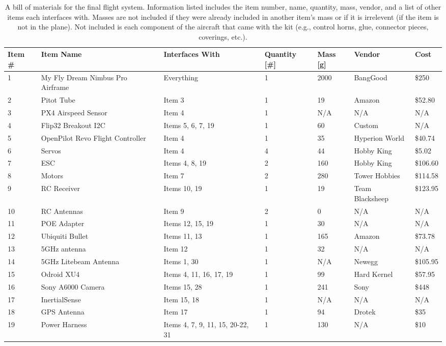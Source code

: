 \documentclass[]{auvsi_doc}
\begin{document}
	\begin{table}[h!]
		\begin{center}
			\caption{A bill of materials for the final flight system. Information listed includes the item number, name, quantity, mass, vendor, and a list of other items each interfaces with. Masses are not included if they were already included in another item's mass or if it is irrelevent (if the item is not in the plane). Not included is each component of the aircraft that came with the kit (e.g., control horns, glue, connector pieces, coverings, etc.).}
			\label{table:BOM}
			\begin{tabular}{p{1cm}p{4cm}p{3cm}p{1.5cm}p{1cm}p{2.5cm}p{1cm}}
				\toprule
				Item \# & Item Name & Interfaces With & Quantity [\#] & Mass [g] & Vendor & Cost \\
				\midrule
				1 & My Fly Dream Nimbus Pro Airframe & Everything & 1 & 2000 & BangGood & \$250  \\
				2 & Pitot Tube & Item 3 & 1 & 19 & Amazon & \$52.80\\
				3 & PX4 Airspeed Sensor & Item 4 & 1 & N/A & N/A & N/A \\
				4 & Flip32 Breakout I2C & Items 5, 6, 7, 19 & 1 & 60 & Custom & N/A \\
				5 & OpenPilot Revo \newline Flight Controller & Item 4 & 1 & 35 & Hyperion \newline World & \$40.74  \\
				6 & Servos & Item 4 & 4 & 44 & Hobby King & \$5.02 \\
				7 & ESC & Items 4, 8, 19 & 2 & 160 & Hobby King & \$106.60 \\
				8 & Motors & Item 7 & 2 & 280 & Tower \newline Hobbies & \$114.58 \\
				9 & RC Receiver & Items 10, 19 & 1 & 19 & Team \newline Blacksheep & \$123.95 \\
				10 & RC Antennas & Item 9 & 2 & 0 & N/A & N/A \\
				11 & POE Adapter & Items 12, 15, 19 & 1 & 30 & N/A & N/A \\
				12 & Ubiquiti Bullet & Items 11, 13 & 1 & 165 & Amazon & \$73.78 \\
				13 & 5GHz antenna & Item 12 & 1 & 32 & N/A & N/A \\
				14 & 5GHz Litebeam \newline Antenna & Items 1, 30 & 1 & N/A & Newegg & \$105.95 \\
				15 & Odroid XU4 & Items 4, 11, 16, 17, 19 & 1 & 99 & Hard Kernel & \$57.95 \\
				16 & Sony A6000 Camera & Items 15, 28 & 1 & 241 & Sony & \$448 \\
				17 & InertialSense & Item 15, 18 & 1 & N/A & N/A & N/A \\
				18 & GPS Antenna & Item 17 & 1 & 94 & Drotek & \$35  \\
				19 & Power Harness & Items 4, 7, 9, 11, 15, 20-22, 31 & 1 & 130 & N/A & \$10 \\
				\bottomrule
			\end{tabular}
		\end{center}
	\end{table}
\end{document}
